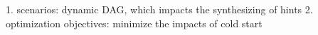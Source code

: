 
1. scenarios: dynamic DAG, which impacts the synthesizing of hints
2. optimization objectives: minimize the impacts of cold start
